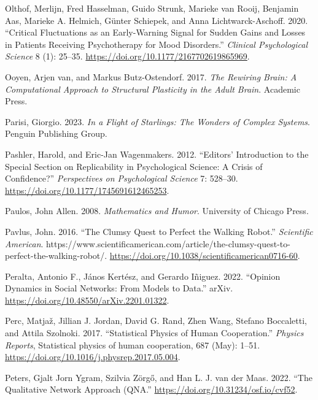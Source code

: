 \documentclass[
  a4paper,
  DIV=11,
  numbers=noendperiod,
  oneside]{scrreprt}
\newlength{\cslhangindent}
\newenvironment{CSLReferences}[2] %
 {\begin{list}{}{%
  \setlength{\itemindent}{0pt}
  \setlength{\leftmargin}{0pt}
  \setlength{\parsep}{0pt}
  \ifodd #1
   \setlength{\leftmargin}{\cslhangindent}
   \setlength{\itemindent}{-1\cslhangindent}
  \fi
  \setlength{\itemsep}{#2\baselineskip}}}
 {\end{list}}
\begin{document}
\begin{CSLReferences}{1}{0}
Olthof, Merlijn, Fred Hasselman, Guido Strunk, Marieke van Rooij,
Benjamin Aas, Marieke A. Helmich, Günter Schiepek, and Anna
Lichtwarck-Aschoff. 2020. {``Critical {Fluctuations} as an
{Early-Warning Signal} for {Sudden Gains} and {Losses} in {Patients
Receiving Psychotherapy} for {Mood Disorders}.''} \emph{Clinical
Psychological Science} 8 (1): 25--35.
\url{https://doi.org/10.1177/2167702619865969}.

Ooyen, Arjen van, and Markus Butz-Ostendorf. 2017. \emph{The {Rewiring
Brain}: {A Computational Approach} to {Structural Plasticity} in the
{Adult Brain}}. {Academic Press}.

Parisi, Giorgio. 2023. \emph{In a Flight of Starlings: The Wonders of
Complex Systems}. Penguin Publishing Group.

Pashler, Harold, and Eric-Jan Wagenmakers. 2012. {``Editors'
Introduction to the Special Section on Replicability in Psychological
Science: {A} Crisis of Confidence?''} \emph{Perspectives on
Psychological Science} 7: 528--30.
\url{https://doi.org/10.1177/1745691612465253}.

Paulos, John Allen. 2008. \emph{Mathematics and {Humor}}. {University of
Chicago Press}.

Pavlus, John. 2016. {``The {Clumsy Quest} to {Perfect} the {Walking
Robot}.''} \emph{Scientific American}.
https://www.scientificamerican.com/article/the-clumsy-quest-to-perfect-the-walking-robot/.
\url{https://doi.org/10.1038/scientificamerican0716-60}.

Peralta, Antonio F., János Kertész, and Gerardo Iñiguez. 2022.
{``Opinion Dynamics in Social Networks: {From} Models to Data.''}
{arXiv}. \url{https://doi.org/10.48550/arXiv.2201.01322}.

Perc, Matjaž, Jillian J. Jordan, David G. Rand, Zhen Wang, Stefano
Boccaletti, and Attila Szolnoki. 2017. {``Statistical Physics of Human
Cooperation.''} \emph{Physics Reports}, Statistical physics of human
cooperation, 687 (May): 1--51.
\url{https://doi.org/10.1016/j.physrep.2017.05.004}.

Peters, Gjalt Jorn Ygram, Szilvia Zörgő, and Han L. J. van der Maas.
2022. {``The {Qualitative Network Approach} ({QNA}.''}
\url{https://doi.org/10.31234/osf.io/cvf52}.


\end{CSLReferences}
\end{document}
